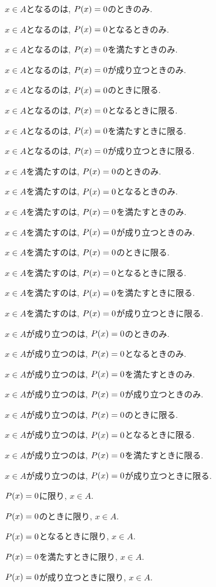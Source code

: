 \item $x\in A$となるのは, $P(x)=0$のときのみ.
\item $x\in A$となるのは, $P(x)=0$となるときのみ.
\item $x\in A$となるのは, $P(x)=0$を満たすときのみ.
\item $x\in A$となるのは, $P(x)=0$が成り立つときのみ.
\item $x\in A$となるのは, $P(x)=0$のときに限る.
\item $x\in A$となるのは, $P(x)=0$となるときに限る.
\item $x\in A$となるのは, $P(x)=0$を満たすときに限る.
\item $x\in A$となるのは, $P(x)=0$が成り立つときに限る.
\item $x\in A$を満たすのは, $P(x)=0$のときのみ.
\item $x\in A$を満たすのは, $P(x)=0$となるときのみ.
\item $x\in A$を満たすのは, $P(x)=0$を満たすときのみ.
\item $x\in A$を満たすのは, $P(x)=0$が成り立つときのみ.
\item $x\in A$を満たすのは, $P(x)=0$のときに限る.
\item $x\in A$を満たすのは, $P(x)=0$となるときに限る.
\item $x\in A$を満たすのは, $P(x)=0$を満たすときに限る.
\item $x\in A$を満たすのは, $P(x)=0$が成り立つときに限る.
\item $x\in A$が成り立つのは, $P(x)=0$のときのみ.
\item $x\in A$が成り立つのは, $P(x)=0$となるときのみ.
\item $x\in A$が成り立つのは, $P(x)=0$を満たすときのみ.
\item $x\in A$が成り立つのは, $P(x)=0$が成り立つときのみ.
\item $x\in A$が成り立つのは, $P(x)=0$のときに限る.
\item $x\in A$が成り立つのは, $P(x)=0$となるときに限る.
\item $x\in A$が成り立つのは, $P(x)=0$を満たすときに限る.
\item $x\in A$が成り立つのは, $P(x)=0$が成り立つときに限る.
\item $P(x)=0$に限り, $x\in A$.
\item $P(x)=0$のときに限り, $x\in A$.
\item $P(x)=0$となるときに限り, $x\in A$.
\item $P(x)=0$を満たすときに限り, $x\in A$.
\item $P(x)=0$が成り立つときに限り, $x\in A$.
